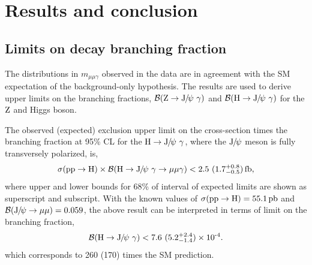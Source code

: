 \chapter{Results and conclusion}
\label{Chap:Results}

\section{Limits on decay branching fraction}
The distributions in $m_{\mu\mu\gamma}$ observed in the data are in agreement with the SM expectation of the background-only hypothesis.
The results are used to derive upper limits on the branching fractions, $\mathcal{B}(\mathrm{Z}\to{\mathrm{J}\hspace{-.08em}/\hspace{-.14em}\psi}\ \gamma)$ and $\mathcal{B}(\mathrm{H}\to{\mathrm{J}\hspace{-.08em}/\hspace{-.14em}\psi}\ \gamma)$ for the $\mathrm{Z}$ and Higgs boson.

The observed (expected) exclusion upper limit on the cross-section times the branching fraction at 95\% CL for the $\mathrm{H}\to{\mathrm{J}\hspace{-.08em}/\hspace{-.14em}\psi}\ \gamma$, where the ${\mathrm{J}\hspace{-.08em}/\hspace{-.14em}\psi}$ meson is fully transversely polarized, is,
\begin{equation}
	\displaystyle
	\sigma(\Pp\Pp\to\PH)\times\mathcal{B}(\PH\to\JPsi\ \gamma\to\mu\mu\gamma)<2.5\ (1.7^{+0.8}_{-0.5})\fb,
	\end{equation}
where upper and lower bounds for 68\% of interval of expected limits are shown as superscript and subscript. 
With the known values of $\sigma(\mathrm{p}\mathrm{p}\to\mathrm{H})=55.1\mbox{\ensuremath{\,\text{pb}}}$ and $\mathcal{B}({\mathrm{J}\hspace{-.08em}/\hspace{-.14em}\psi}\to\mu\mu) = 0.059$, the above result can be interpreted in terms of limit on  the branching fraction,
\begin{equation}
	\displaystyle
	\mathcal{B}(\PH\to\JPsi\ \gamma)<7.6\ (5.2^{+2.4}_{-1.4})\ten{-4}.
	\end{equation}
which corresponds to 260 (170) times the SM prediction.  

